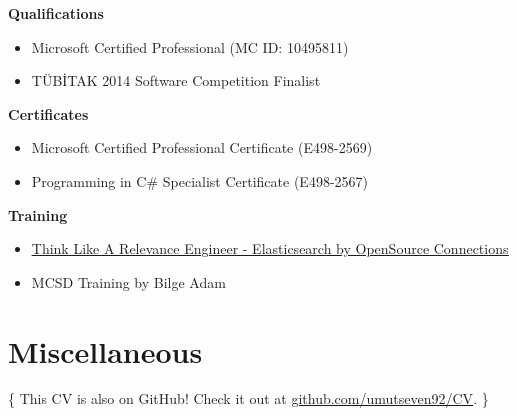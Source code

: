 \documentclass[11pt,a4paper,sans]{moderncv}        %
\begin{document}
\textbf{Qualifications}
\begin{itemize}
\item Microsoft Certified Professional (MC ID: 10495811)
\item TÜBİTAK 2014 Software Competition Finalist
\end{itemize}

\vspace{5pt}

\textbf{Certificates}
\begin{itemize}
\item Microsoft Certified Professional Certificate (E498-2569)
\item Programming in C\# Specialist Certificate (E498-2567)
\end{itemize}

\vspace{5pt}

\textbf{Training}
\begin{itemize}
\item \href{https://badgr.com/public/assertions/m5HJzTYOSBKl15TJ0P3vQw}{\underline{Think Like A Relevance Engineer - Elasticsearch by OpenSource Connections}}
\item MCSD Training by Bilge Adam
\end{itemize}

\vspace{5pt}


\section{Miscellaneous}



               
\vspace*{\fill}
\color{color2} \centerline{\{ This CV is also on GitHub! Check it out at \href{https://github.com/umutseven92/CV}{github.com/umutseven92/CV}. \}}

\color{color3}
\end{document}

